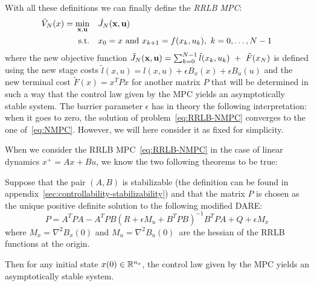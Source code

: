 \documentclass[12pt]{article}
\begin{document}
\vspace{24pt}

\noindent With all these definitions we can finally define the \textit{RRLB MPC}:
\begin{align}
	\begin{split}\label{eq:RRLB-NMPC}
		\tilde{V}_N(x)=\underset{\bf{x},\bf{u}}{\min} &\quad \tilde{J}_N(\bf{x},\bf{u})\\
		\text{s.t.} &\quad x_0=x\text{ and }x_{k+1}=f(x_k,u_k),~k=0,\ldots,N-1\\
	\end{split}
\end{align}
where the new objective function $\tilde{J}_N(\bf{x},\bf{u})=\sum_{k=0}^{N-1}\tilde{l}(x_k,u_k)~+~\tilde{F}(x_N)$ is defined using the new stage costs $\tilde{l}(x,u)=l(x,u)+\epsilon B_x(x)+\epsilon B_u(u)$ and the new terminal cost $\tilde{F}(x)=x^TPx$ for another matrix $P$ that will be determined in such a way that the control law given by the MPC yields an asymptotically stable system.
The barrier parameter $\epsilon$ has in theory the following interpretation: when it goes to zero, the solution of problem~\ref{eq:RRLB-NMPC} converges to the one of~\ref{eq:NMPC}.
However, we will here consider it as fixed for simplicity.

\vspace{12pt}

\noindent When we consider the RRLB MPC~\ref{eq:RRLB-NMPC} in the case of linear dynamics $x^+=Ax+Bu$, we know the two following theorems to be true:

\begin{theorem}
	\label{nominal-stability-linear-case}
	Suppose that the pair $(A,B)$ is stabilizable (the definition can be found in appendix~\ref{sec:controllability-stabilizability})
	and that the matrix $P$ is chosen as the unique positive definite solution to the following modified DARE:
	$$P=A^TPA-A^TPB(R+\epsilon M_u+B^TPB)^{-1}B^TPA+Q+\epsilon M_x$$
	where $M_x=\nabla^2 B_x(0)$ and $M_u=\nabla^2 B_u(0)$\, are the hessian of the RRLB functions at the origin.

	Then for any initial state $x(0)\in\R^{n_x}$, the control law given by the MPC yields an asymptotically stable system.
\end{theorem}
\end{document}
